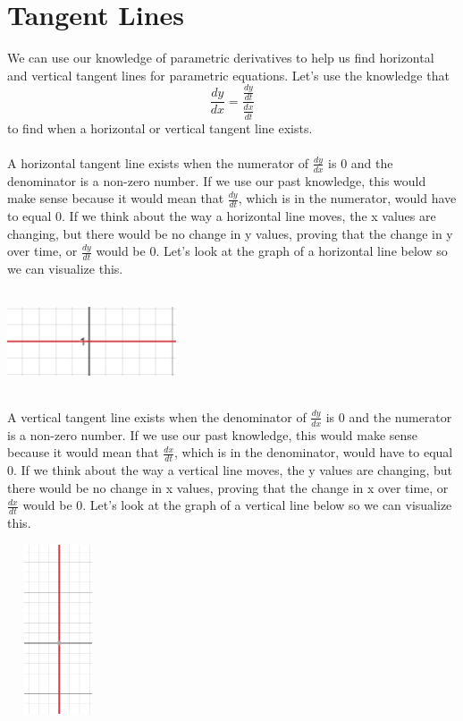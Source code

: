 \documentclass[a4paper,openright, 14pt]{article}
\begin{document}
\section*{Tangent Lines}
We can use our knowledge of parametric derivatives to help us find horizontal and vertical tangent lines for parametric equations. Let's use the knowledge that 
$$\frac{dy}{dx}=\frac{\frac{dy}{dt}}{\frac{dx}{dt}}$$ to find when a horizontal or vertical tangent line exists.\\\\
A horizontal tangent line exists when the numerator of $\frac{dy}{dx}$ is 0 and the denominator is a non-zero number. If we use our past knowledge, this would make sense because it would mean that $\frac{dy}{dt}$, which is in the numerator, would have to equal 0. If we think about the way a horizontal line moves, the x values are changing, but there would be no change in y values, proving that the change in y over time, or $\frac{dy}{dt}$ would be 0. Let's look at the graph of a horizontal line below so we can visualize this.
\begin{center}
    \includegraphics[width= 5cm, height=3cm]{Images/horizline.png}
\end{center}
A vertical tangent line exists when the denominator of $\frac{dy}{dx}$ is 0 and the numerator is a non-zero number. If we use our past knowledge, this would make sense because it would mean that $\frac{dx}{dt}$, which is in the denominator, would have to equal 0. If we think about the way a vertical line moves, the y values are changing, but there would be no change in x values, proving that the change in x over time, or $\frac{dx}{dt}$ would be 0. Let's look at the graph of a vertical line below so we can visualize this.
\begin{center}
    \includegraphics[width=3cm, height=5cm]{Images/vertline.png}
\end{center}
\end{document}
